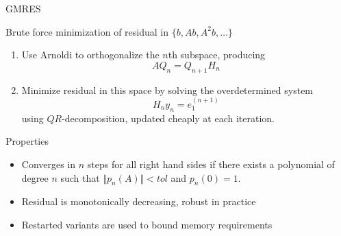\begin{frame}{GMRES}

\begin{block}{Brute force minimization of residual in $\{b,Ab,A^2b,\dotsc\}$}
  \begin{enumerate}
  \item Use Arnoldi to orthogonalize the $n$th subspace, producing
    \[ A Q_n = Q_{n+1} H_n \]
  \item Minimize residual in this space by solving the overdetermined system
    \[ H_n y_n = e_1^{(n+1)} \]
    using $QR$-decomposition, updated cheaply at each iteration.
  \end{enumerate}
\end{block}

\begin{block}{Properties}
  \begin{itemize}
  \item Converges in $n$ steps for all right hand sides if there exists a polynomial of degree $n$
    such that $\Vert p_n(A) \Vert < \textit{tol}$ and $p_n(0)=1$.
  \item Residual is monotonically decreasing, robust in practice
  \item Restarted variants are used to bound memory requirements
  \end{itemize}
\end{block}
\end{frame}
